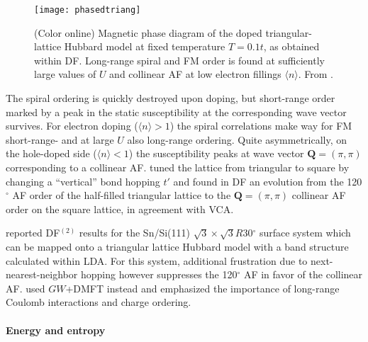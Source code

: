 \documentclass[rmp,aps,reprint,amsmath,amssymb,superscriptaddress,showpacs,nofootinbib]{revtex4-1}
\newcommand{\vc}[1]{\ensuremath{\mathbf{#1}}}
\begin{document}
\begin{figure}[t]
\begin{center}
  \texttt{[image: phasedtriang]} 
\end{center}
    \caption{(Color online) Magnetic phase diagram of the doped triangular-lattice Hubbard model at fixed temperature $T=0.1t$, as obtained within DF. Long-range spiral and FM order is found at sufficiently large values of $U$ and collinear AF at low electron fillings $\langle n\rangle$. From  .}
  \label{fig:phasedtriang}
\end{figure}

The spiral ordering is quickly destroyed upon doping, but short-range order marked by a peak in the static susceptibility at the corresponding wave vector survives. For electron doping ($\langle n\rangle>1$) the spiral correlations make way for FM short-range- and at large $U$ also long-range ordering. Quite asymmetrically, on the hole-doped side ($\langle n\rangle<1$) the susceptibility peaks at  wave vector $\vc{Q}=(\pi,\pi)$ corresponding to a collinear AF.  tuned the lattice from triangular to  square by changing a ``vertical'' bond hopping $t'$ and found in DF an evolution from the 120$^{\circ}$ AF order of the half-filled triangular lattice to the  $\vc{Q}=(\pi,\pi)$ collinear AF order on the square lattice, in agreement with VCA.

 reported DF$^{(2)}$ results for the Sn/Si(111) $\sqrt{3}\times\sqrt{3}R$30$^{\circ}$ surface system which can be mapped onto a triangular lattice Hubbard model with a band structure calculated within LDA.  For this system, additional frustration due to next-nearest-neighbor hopping however suppresses the 120$^{\circ}$ AF in favor of the collinear AF.   used $GW$+DMFT instead and 
emphasized the importance of long-range Coulomb interactions and charge ordering.


\paragraph*{Energy and entropy}
\end{document}
